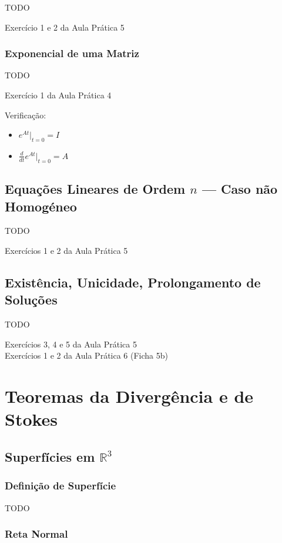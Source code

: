 \documentclass[11pt, a4paper]{article}
\begin{document}
TODO

Exercício 1 e 2 da Aula Prática 5

\subsubsection{Exponencial de uma Matriz}

TODO

Exercício 1 da Aula Prática 4

Verificação:
\begin{itemize}
    \item $\displaystyle e^{At}|_{t=0} = I$
    \item $\displaystyle \frac{d}{dt}e^{At}|_{t=0} = A $
\end{itemize}

\subsection{Equações Lineares de Ordem $n$ — Caso não Homogéneo}

TODO

Exercícios 1 e 2 da Aula Prática 5

\subsection{Existência, Unicidade, Prolongamento de Soluções}

TODO

Exercícios 3, 4 e 5 da Aula Prática 5 \\
Exercícios 1 e 2 da Aula Prática 6 (Ficha 5b)

\newpage

\section{Teoremas da Divergência e de Stokes}

\subsection{Superfícies em $\mathbb{R}^3$}

\subsubsection{Definição de Superfície}

TODO

\subsubsection{Reta Normal}
\end{document}
